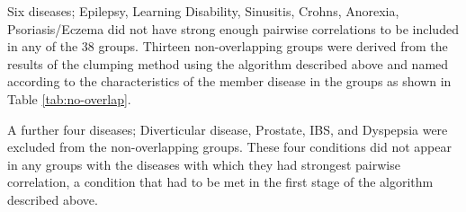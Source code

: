 \documentclass[12pt,]{report}
\begin{document}
Six diseases; Epilepsy, Learning Disability, Sinusitis, Crohns,
Anorexia, Psoriasis/Eczema did not have strong enough pairwise
correlations to be included in any of the 38 groups. Thirteen
non-overlapping groups were derived from the results of the clumping
method using the algorithm described above and named according to the
characteristics of the member disease in the groups as shown in Table
\ref{tab:no-overlap}.

A further four diseases; Diverticular disease, Prostate, IBS, and
Dyspepsia were excluded from the non-overlapping groups. These four
conditions did not appear in any groups with the diseases with which
they had strongest pairwise correlation, a condition that had to be met
in the first stage of the algorithm described above.

\begin{table}[]
  \centering
  \caption{Non-overlapping groups of diseases derived from Ng algorithm}
  \label{tab:no-overlap}
\end{table}
\end{document}
